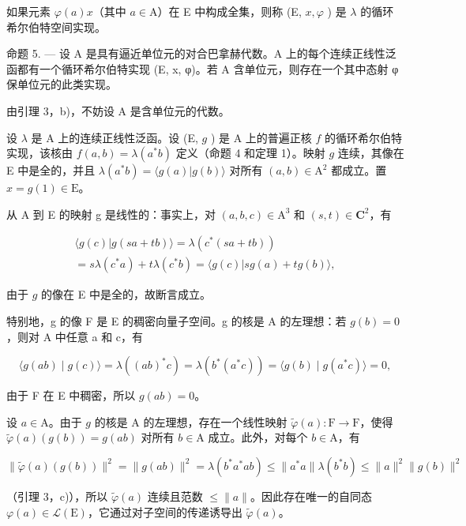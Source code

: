 如果元素 \(\varphi(a)x\)（其中 \(a\in\mathrm{A}\)）在 E 中构成全集，则称 (E, \(x,\varphi\) ) 是 \(\lambda\) 的循环希尔伯特空间实现。

命题 5. --- 设 A 是具有逼近单位元的对合巴拿赫代数。A 上的每个连续正线性泛函都有一个循环希尔伯特实现 (E, x, φ)。若 A 含单位元，则存在一个其中态射 φ 保单位元的此类实现。

由引理 3，b)，不妨设 A 是含单位元的代数。

设 \(\lambda\) 是 A 上的连续正线性泛函。设 (E, \(g\) ) 是 A 上的普遍正核 \(f\) 的循环希尔伯特实现，该核由 \(f(a,b) = \lambda(a^{*}b)\) 定义（命题 4 和定理 1）。映射 \(g\) 连续，其像在 E 中是全的，并且 \(\lambda(a^{*}b) = \langle g(a)|g(b)\rangle\) 对所有 \((a,b) \in \mathrm{A}^2\) 都成立。置 \(x = g(1) \in \mathrm{E}\)。

从 A 到 E 的映射 g 是线性的：事实上，对 \((a,b,c)\in\mathrm{A}^{3}\) 和 \((s,t)\in\mathbf{C}^{2}\)，有

\[
\begin{array}{c} \langle g (c) | g (s a + t b) \rangle = \lambda (c ^ {*} (s a + t b)) \\ = s \lambda (c ^ {*} a) + t \lambda (c ^ {*} b) = \langle g (c) | s g (a) + t g (b) \rangle , \end{array}
\]

由于 \(g\) 的像在 E 中是全的，故断言成立。

特别地，g 的像 F 是 E 的稠密向量子空间。g 的核是 A 的左理想：若 \(g(b) = 0\)，则对 A 中任意 a 和 c，有

\[
\langle g (a b) \mid g (c) \rangle = \lambda ((a b) ^ {*} c) = \lambda (b ^ {*} (a ^ {*} c)) = \langle g (b) \mid g (a ^ {*} c) \rangle = 0,
\]

由于 F 在 E 中稠密，所以 \(g(ab) = 0\)。

设 \(a \in \mathrm{A}\)。由于 \(g\) 的核是 \(\mathrm{A}\) 的左理想，存在一个线性映射 \(\widetilde{\varphi}(a) \colon \mathrm{F} \to \mathrm{F}\)，使得 \(\widetilde{\varphi}(a)(g(b)) = g(ab)\) 对所有 \(b \in \mathrm{A}\) 成立。此外，对每个 \(b \in \mathrm{A}\)，有

\[
\| \widetilde {\varphi} (a) (g (b)) \| ^ {2} = \| g (a b) \| ^ {2} = \lambda \left(b ^ {*} a ^ {*} a b\right) \leqslant \| a ^ {*} a \| \lambda \left(b ^ {*} b\right) \leqslant \| a \| ^ {2} \| g (b) \| ^ {2}
\]

（引理 3，c)），所以 \(\widetilde{\varphi}(a)\) 连续且范数 \(\leqslant \|a\|\)。因此存在唯一的自同态 \(\varphi(a) \in \mathcal{L}(\mathrm{E})\)，它通过对子空间的传递诱导出 \(\widetilde{\varphi}(a)\)。

